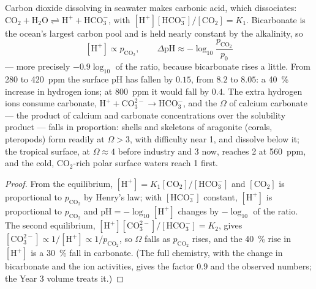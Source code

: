\begin{theorem}[Acidification]\label{thm:b2:global-change:acid}
Carbon dioxide dissolving in seawater makes carbonic acid, which
dissociates: $\ensuremath{\mathrm{CO_2}} + \ensuremath{\mathrm{H_2O}} \rightleftharpoons \ensuremath{\mathrm{H^{+}}} +
\ensuremath{\mathrm{HCO_3^{-}}}$, with $[\ensuremath{\mathrm{H^{+}}}][\ensuremath{\mathrm{HCO_3^{-}}}]/[\ensuremath{\mathrm{CO_2}}] = K_1$.
Bicarbonate is the ocean's largest carbon pool and is held nearly
constant by the alkalinity, so
\[
[\ensuremath{\mathrm{H^{+}}}] \propto p_{\ensuremath{\mathrm{CO_2}}}, \qquad
\Delta\mathrm{pH} \approx -\log_{10}\frac{p_{\ensuremath{\mathrm{CO_2}}}}{p_0}
\]
--- more precisely $-0.9\log_{10}$ of the ratio, because bicarbonate
rises a little. From 280 to \qty{420}{ppm} the surface pH has fallen
by $0.15$, from $8.2$ to $8.05$: a \qty{40}{\%} increase in hydrogen
ions; at \qty{800}{ppm} it would fall by $0.4$. The extra hydrogen
ions consume carbonate, $\ensuremath{\mathrm{H^{+}}} + \ensuremath{\mathrm{CO_3^{2-}}} \to \ensuremath{\mathrm{HCO_3^{-}}}$, and
the \emph{} $\Omega$ of calcium carbonate ---
the product of calcium and carbonate concentrations over the
solubility product --- falls in proportion: shells and skeletons
of aragonite (corals, pteropods) form readily at $\Omega > 3$, with
difficulty near 1, and dissolve below it; the tropical surface,
at $\Omega \approx 4$ before industry and 3 now, reaches 2 at
\qty{560}{ppm}, and the cold, \ensuremath{\mathrm{CO_2}}-rich polar surface waters
reach 1 first.
\end{theorem}
\begin{proof}
From the equilibrium, $[\ensuremath{\mathrm{H^{+}}}] = K_1[\ensuremath{\mathrm{CO_2}}]/[\ensuremath{\mathrm{HCO_3^{-}}}]$ and
$[\ensuremath{\mathrm{CO_2}}]$ is proportional to $p_{\ensuremath{\mathrm{CO_2}}}$ by Henry's law;
with $[\ensuremath{\mathrm{HCO_3^{-}}}]$ constant, $[\ensuremath{\mathrm{H^{+}}}]$ is proportional to
$p_{\ensuremath{\mathrm{CO_2}}}$ and $\mathrm{pH} = -\log_{10}[\ensuremath{\mathrm{H^{+}}}]$ changes by
$-\log_{10}$ of the ratio. The second equilibrium, $[\ensuremath{\mathrm{H^{+}}}][\ensuremath{\mathrm{CO_3^{2-}}}]/[\ensuremath{\mathrm{HCO_3^{-}}}]
= K_2$, gives $[\ensuremath{\mathrm{CO_3^{2-}}}] \propto 1/[\ensuremath{\mathrm{H^{+}}}] \propto
1/p_{\ensuremath{\mathrm{CO_2}}}$, so $\Omega$ falls as $p_{\ensuremath{\mathrm{CO_2}}}$ rises, and
the \qty{40}{\%} rise in $[\ensuremath{\mathrm{H^{+}}}]$ is a \qty{30}{\%} fall in
carbonate. (The full chemistry, with the change in bicarbonate and
the ion activities, gives the factor $0.9$ and the observed
numbers; the Year 3 volume treats it.)
\end{proof}
